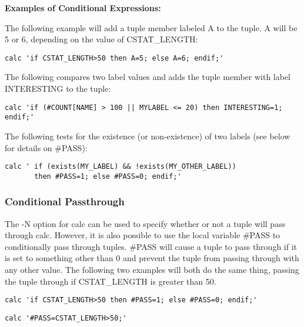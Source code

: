 \documentclass[11pt]{article}
\begin{document}
\textbf{Examples of Conditional Expressions:}

\begin{itemize*}

\item The following example will add a tuple member labeled A to the tuple.  A will be 5 or 6,
depending
on the value of CSTAT\_LENGTH:

\begin{lstlisting}
calc 'if CSTAT_LENGTH>50 then A=5; else A=6; endif;'
\end{lstlisting}

\item The following compares two label values and adds the tuple member with label INTERESTING to
the tuple:

\begin{lstlisting}
calc 'if (#COUNT[NAME] > 100 || MYLABEL <= 20) then INTERESTING=1; endif;'
\end{lstlisting}

\item The following tests for the existence (or non-existence) of two labels (see below for details
on \#PASS):

\begin{lstlisting}
calc ' if (exists(MY_LABEL) && !exists(MY_OTHER_LABEL)) 
       then #PASS=1; else #PASS=0; endif;'
\end{lstlisting}

\end{itemize*}

\subsubsection {Conditional Passthrough}

The -N option for calc can be used to specify whether or not a tuple will pass through calc.
However, it is also possible to use the local variable \#PASS to conditionally pass through tuples.
\#PASS will cause a tuple to pass through if it is set to something other than 0 and prevent the
tuple from passing through with any other value.  The following two examples will both do the same thing,
passing the tuple through if CSTAT\_LENGTH is greater than 50.

\begin{lstlisting}
calc 'if CSTAT_LENGTH>50 then #PASS=1; else #PASS=0; endif;'
\end{lstlisting}

\begin{lstlisting}
calc '#PASS=CSTAT_LENGTH>50;'
\end{lstlisting}
\end{document}
